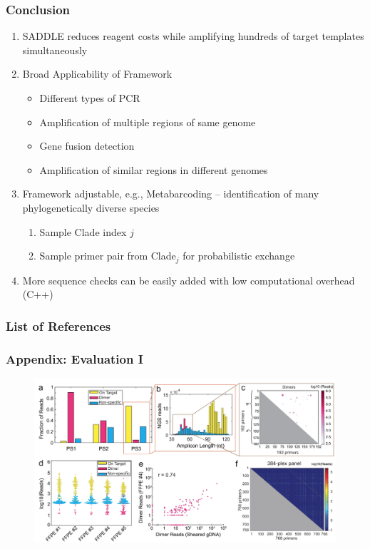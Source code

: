 \documentclass[xcolor=dvipsnames,envcountsect]{beamer}
\begin{document}
\begin{frame}\frametitle{Conclusion}
\begin{enumerate}
    \item SADDLE reduces reagent costs while amplifying hundreds of target templates simultaneously
    \item Broad Applicability of Framework
    \begin{itemize}
       \item Different types of PCR
        \item Amplification of multiple regions of same genome
        \item Gene fusion detection
        \item Amplification of similar regions in different genomes
    \end{itemize}
    \item Framework adjustable, e.g., Metabarcoding -- identification of many phylogenetically diverse species %
        \begin{enumerate}
            \item Sample Clade index $j$
            \item Sample primer pair from Clade$_j$ for probabilistic exchange
        \end{enumerate} 
    \item More sequence checks can be easily added with low computational overhead (C++)
\end{enumerate}
\nocite{Xie2022, PriSeT2021}
\end{frame}

	\begin{frame}[allowframebreaks]
		\justifying
		\frametitle{List of References}
		\printbibliography
	\end{frame}


\begin{frame}\frametitle{Appendix: Evaluation I}
\begin{figure}
    \includegraphics[width=\textwidth]{fig3_paper}
\end{figure}
\end{frame}
\end{document}

